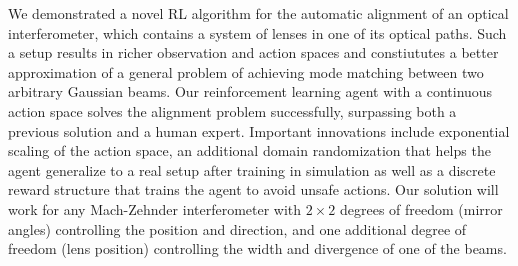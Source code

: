 We demonstrated a novel RL algorithm for the automatic alignment of an optical interferometer, which contains a system of lenses in one of its optical paths. Such a setup results in richer observation and action spaces and constiututes a better approximation of a general problem of achieving mode matching between two arbitrary Gaussian beams.  Our reinforcement learning agent with a continuous action space solves the alignment problem successfully, surpassing both a previous solution and a human expert. Important innovations include exponential scaling of the action space, an additional domain randomization that helps the agent generalize to a real setup after training in simulation as well as a discrete reward structure that trains the agent to avoid unsafe actions. Our solution will work for any Mach-Zehnder interferometer with $2\times2$ degrees of freedom (mirror angles) controlling the  position and direction, and one additional degree of freedom (lens position) controlling the width and divergence of one of the beams. %



\FloatBarrier
